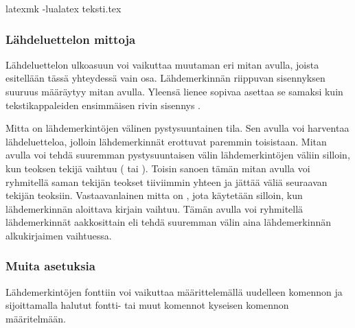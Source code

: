 \begin{koodilohkosis}
latexmk -lualatex teksti.tex    %
\end{koodilohkosis}

\subsubsection{Lähdeluettelon mittoja}

Lähdeluettelon ulkoasuun voi vaikuttaa muutaman eri mitan avulla, joista
esitellään tässä yhteydessä vain osa. Lähdemerkinnän riippuvan
sisennyksen suuruus määräytyy mitan  avulla. Yleensä
lienee sopivaa asettaa se samaksi kuin tekstikappaleiden ensimmäisen
rivin sisennys .

\begin{koodilohkosis}
\setlength{\parindent}{1.1em} %
\setlength{\bibhang}{\parindent}
\end{koodilohkosis}

Mitta  on lähdemerkintöjen välinen pystysuuntainen
tila.  Sen avulla voi harventaa lähdeluetteloa,
jolloin lähdemerkinnät erottuvat paremmin toisistaan. Mitan
 avulla voi tehdä suuremman pystysuuntaisen välin
lähdemerkintöjen väliin silloin, kun teoksen tekijä vaihtuu
( tai ). Toisin sanoen tämän mitan avulla
voi ryhmitellä saman tekijän teokset tiiviimmin yhteen ja jättää väliä
seuraavan tekijän teoksiin. Vastaavanlainen mitta on
, jota käytetään silloin, kun lähdemerkinnän
aloittava kirjain vaihtuu. Tämän avulla voi ryhmitellä lähdemerkinnät
aakkosittain eli tehdä suuremman välin aina lähdemerkinnän alkukirjaimen
vaihtuessa.

\begin{koodilohkosis}
\setlength{\bibitemsep}{.5ex plus .1ex minus .1ex}
\setlength{\bibnamesep}{1em  plus .2ex minus .1ex}
\setlength{\bibinitsep}{2em  plus .2ex minus .1ex}
\end{koodilohkosis}

\subsubsection{Muita asetuksia}

Lähdemerkintöjen fonttiin voi vaikuttaa määrittelemällä uudelleen
komennon  ja sijoittamalla halutut fontti- tai muut
komennot kyseisen komennon määritelmään.

